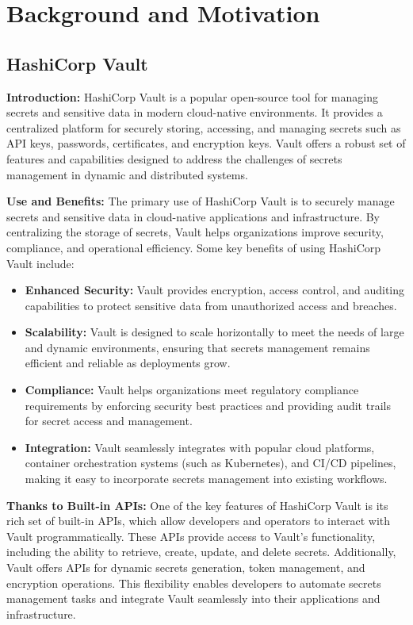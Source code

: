 \section{Background and Motivation}

\subsection{HashiCorp Vault}

\textbf{Introduction:}
HashiCorp Vault is a popular open-source tool for managing secrets and sensitive data in modern cloud-native environments. It provides a centralized platform for securely storing, accessing, and managing secrets such as API keys, passwords, certificates, and encryption keys. Vault offers a robust set of features and capabilities designed to address the challenges of secrets management in dynamic and distributed systems.

\textbf{Use and Benefits:}
The primary use of HashiCorp Vault is to securely manage secrets and sensitive data in cloud-native applications and infrastructure. By centralizing the storage of secrets, Vault helps organizations improve security, compliance, and operational efficiency. Some key benefits of using HashiCorp Vault include:

\begin{itemize}
    \item \textbf{Enhanced Security:} Vault provides encryption, access control, and auditing capabilities to protect sensitive data from unauthorized access and breaches.
    
    \item \textbf{Scalability:} Vault is designed to scale horizontally to meet the needs of large and dynamic environments, ensuring that secrets management remains efficient and reliable as deployments grow.
    
    \item \textbf{Compliance:} Vault helps organizations meet regulatory compliance requirements by enforcing security best practices and providing audit trails for secret access and management.
    
    \item \textbf{Integration:} Vault seamlessly integrates with popular cloud platforms, container orchestration systems (such as Kubernetes), and CI/CD pipelines, making it easy to incorporate secrets management into existing workflows.
\end{itemize}

\textbf{Thanks to Built-in APIs:}
One of the key features of HashiCorp Vault is its rich set of built-in APIs, which allow developers and operators to interact with Vault programmatically. These APIs provide access to Vault's functionality, including the ability to retrieve, create, update, and delete secrets. Additionally, Vault offers APIs for dynamic secrets generation, token management, and encryption operations. This flexibility enables developers to automate secrets management tasks and integrate Vault seamlessly into their applications and infrastructure.

